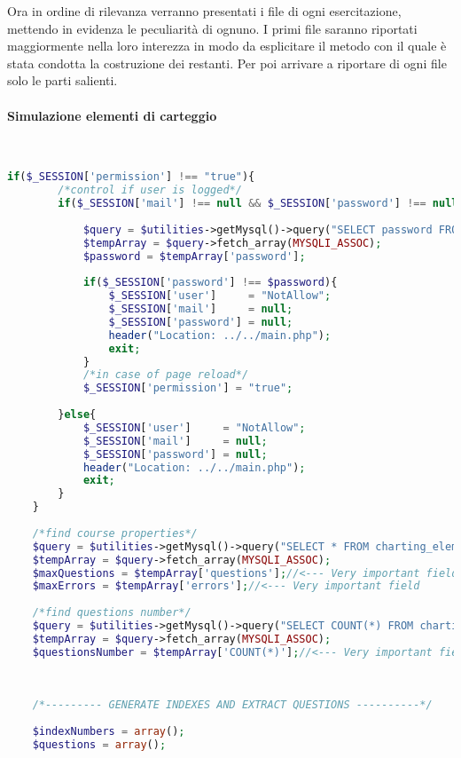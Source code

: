 Ora in ordine di rilevanza verranno presentati i file di ogni esercitazione, mettendo in evidenza le peculiarità di ognuno. I primi file saranno riportati maggiormente nella loro interezza in modo da esplicitare il metodo con il quale è stata condotta la costruzione dei restanti. Per poi arrivare a riportare di ogni file solo le parti salienti.\\

\paragraph{Simulazione elementi di carteggio}\leavevmode\\

\begin{lstlisting}[language=php]
	if($_SESSION['permission'] !== "true"){
		/*control if user is logged*/
		if($_SESSION['mail'] !== null && $_SESSION['password'] !== null){
			
			$query = $utilities->getMysql()->query("SELECT password FROM user_table1 WHERE (email = '{$_SESSION['mail']}')");
			$tempArray = $query->fetch_array(MYSQLI_ASSOC);
			$password = $tempArray['password'];
			
			if($_SESSION['password'] !== $password){
				$_SESSION['user']     = "NotAllow";
				$_SESSION['mail']     = null;
				$_SESSION['password'] = null;
				header("Location: ../../main.php");
				exit;
			}
			/*in case of page reload*/
			$_SESSION['permission'] = "true";
			
		}else{
			$_SESSION['user']     = "NotAllow";
			$_SESSION['mail']     = null;
			$_SESSION['password'] = null;
			header("Location: ../../main.php");
			exit;
		}
	}
	
	/*find course properties*/
	$query = $utilities->getMysql()->query("SELECT * FROM charting_elements_properties WHERE (id = '1')");
	$tempArray = $query->fetch_array(MYSQLI_ASSOC);
	$maxQuestions = $tempArray['questions'];//<--- Very important field
	$maxErrors = $tempArray['errors'];//<--- Very important field
	
	/*find questions number*/
	$query = $utilities->getMysql()->query("SELECT COUNT(*) FROM charting_elements");
	$tempArray = $query->fetch_array(MYSQLI_ASSOC);
	$questionsNumber = $tempArray['COUNT(*)'];//<--- Very important field
	
	
	
	/*--------- GENERATE INDEXES AND EXTRACT QUESTIONS ----------*/
	
	$indexNumbers = array();
	$questions = array();
	

\end{lstlisting}
